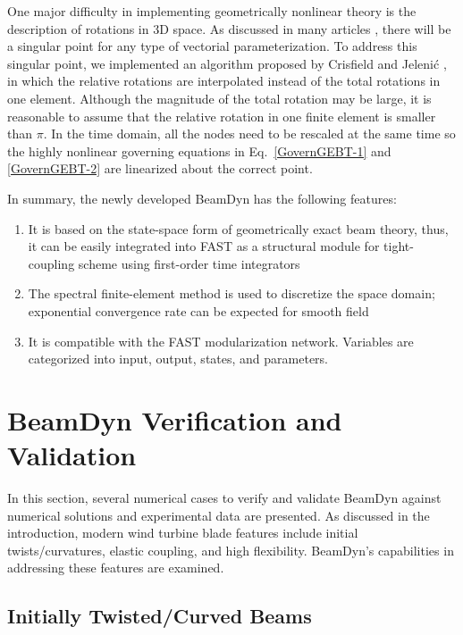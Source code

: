 \documentclass{aiaa-tc}
\begin{document}
One major difficulty in implementing geometrically nonlinear theory is the description of rotations in 3D space. As discussed in many articles \cite{Crisfield:1999,Bauchau:2010,Bottasso:1998}, there will be a singular point for any type of vectorial parameterization. To address this singular point, we implemented an algorithm proposed by Crisfield and Jeleni\'c \cite{Crisfield:1999}, in which the relative rotations are interpolated instead of the total rotations in one element. Although the magnitude of the total rotation may be large, it is reasonable to assume that the relative rotation in one finite element is smaller than $\pi$. In the time domain, all the nodes need to be rescaled at the same time so the highly nonlinear governing equations in Eq.~\eqref{GovernGEBT-1} and \eqref{GovernGEBT-2} are linearized about the correct point.

In summary, the newly developed BeamDyn has the following features: 
\begin{enumerate}
    \item It is based on the state-space form of geometrically exact beam theory, thus, it can be easily integrated into FAST as a structural module for tight-coupling scheme using first-order time integrators
    \item The spectral finite-element method is used to discretize the space domain; exponential convergence rate can be expected for smooth field
    \item It is compatible with the FAST modularization network. Variables are categorized into input, output, states, and parameters.
\end{enumerate}

\section{BeamDyn Verification and Validation}
In this section, several numerical cases to verify and validate BeamDyn against numerical solutions and experimental data are presented. As discussed in the introduction, modern wind turbine blade features include initial twists/curvatures, elastic coupling, and high flexibility. BeamDyn's capabilities in addressing these features are examined.

\subsection{Initially Twisted/Curved Beams}
\end{document}
